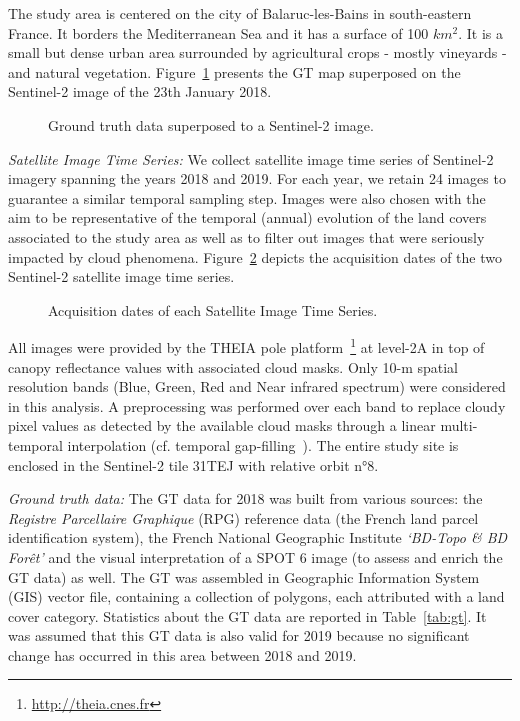 The study area is centered on the city of Balaruc-les-Bains in south-eastern France. It borders the Mediterranean Sea and it has a surface of 100 $ km^2 $. It is a small but dense urban area surrounded by agricultural crops - mostly vineyards - and natural vegetation. Figure~\ref{fig:gtmap} presents the GT map superposed on the Sentinel-2 image of the 23th January 2018. 

\begin{figure}[htb]
\begin{minipage}[b]{1.0\linewidth}
  \centering
    \centerline{}
\end{minipage}
\caption{Ground truth data superposed to a Sentinel-2 image.}
\label{fig:gtmap}
\end{figure}


\textit{Satellite Image Time Series:} We collect satellite image time series of Sentinel-2 imagery spanning the years 2018 and 2019. For each year, we retain 24 images to guarantee a similar temporal sampling step. Images were also chosen with the aim to be representative of the temporal (annual) evolution of the land covers associated to the study area as well as to filter out images that were seriously impacted by cloud phenomena. Figure~\ref{fig:chronology} depicts the acquisition dates of the two Sentinel-2 satellite image time series. 

\begin{figure}[htb]
\begin{minipage}[b]{1.0\linewidth}
  \centering
    \centerline{}
\end{minipage}
\caption{Acquisition dates of each Satellite Image Time Series.}
\label{fig:chronology}
\end{figure}

All images were provided by the THEIA pole platform~\footnote{\url{http://theia.cnes.fr}} at level-2A in top of canopy reflectance values with associated cloud masks. Only 10-m spatial resolution bands (Blue, Green, Red and Near infrared spectrum) were considered in this analysis. A preprocessing was performed over each band to replace cloudy pixel values as detected by the available cloud masks through a linear multi-temporal interpolation (cf. temporal gap-filling~\cite{IENCO201911}). The entire study site is enclosed in the Sentinel-2 tile 31TEJ with relative orbit n°8.

\textit{Ground truth data:} The GT data for 2018 was built from various sources: the \textit{Registre Parcellaire Graphique} (RPG) reference data (the French land parcel identification system), the French National Geographic Institute \textit{‘BD-Topo \& BD Forêt’} and the visual interpretation of a SPOT 6 image (to assess and enrich the GT data) as well. The GT was assembled in Geographic Information System (GIS) vector file, containing a collection of polygons, each attributed with a land cover category. Statistics about the GT data are reported in Table~\ref{tab:gt}.
It was assumed that this GT data is also valid for 2019 because no significant change has occurred in this area between 2018 and 2019. 

